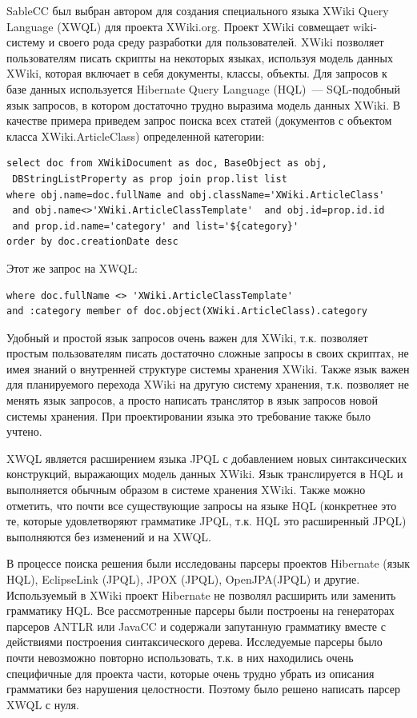 \documentclass[a4paper,12pt,titlepage]{extarticle}
\begin{document}
SableCC был выбран автором для создания специального языка XWiki Query Language
(XWQL) \cite{xwql} для проекта XWiki.org. Проект XWiki совмещает wiki-систему и
своего рода среду разработки для пользователей. XWiki позволяет пользователям
писать скрипты на некоторых языках, используя модель данных XWiki, которая
включает в себя документы, классы, объекты. Для запросов к базе данных
используется Hibernate Query Language (HQL)~--- SQL-подобный язык запросов, в
котором достаточно трудно выразима модель данных XWiki. В качестве примера
приведем запрос поиска всех статей (документов с объектом класса
XWiki.ArticleClass) определенной категории:
\begin{verbatim}
select doc from XWikiDocument as doc, BaseObject as obj, 
 DBStringListProperty as prop join prop.list list
where obj.name=doc.fullName and obj.className='XWiki.ArticleClass' 
 and obj.name<>'XWiki.ArticleClassTemplate'  and obj.id=prop.id.id
 and prop.id.name='category' and list='${category}'
order by doc.creationDate desc
\end{verbatim}
Этот же запрос на XWQL:
\begin{verbatim}
where doc.fullName <> 'XWiki.ArticleClassTemplate' 
and :category member of doc.object(XWiki.ArticleClass).category
\end{verbatim}
Удобный и простой язык запросов очень важен для XWiki, т.к. позволяет простым
пользователям писать достаточно сложные запросы в своих скриптах, не имея
знаний о внутренней структуре системы хранения XWiki. Также язык важен для
планируемого перехода XWiki на другую систему хранения, т.к. позволяет не менять
язык запросов, а просто написать транслятор в язык запросов новой системы
хранения. При проектировании языка это требование также было учтено.

XWQL является расширением языка JPQL \cite{jpql} с добавлением новых
синтаксических конструкций, выражающих модель данных XWiki. Язык транслируется
в HQL и выполняется обычным образом в системе хранения XWiki.  Также
можно отметить, что почти все существующие запросы на языке HQL (конкретнее это
те, которые удовлетворяют грамматике JPQL, т.к. HQL это расширенный JPQL)
выполняются без изменений и на XWQL.

В процессе поиска решения были исследованы парсеры проектов Hibernate (язык
HQL), EclipseLink (JPQL), JPOX (JPQL), OpenJPA(JPQL) и другие.
Используемый в XWiki проект Hibernate не позволял расширить или заменить
грамматику HQL.
Все рассмотренные парсеры были построены на генераторах парсеров ANTLR или
JavaCC и содержали запутанную грамматику вместе с действиями построения
синтаксического дерева.
Исследуемые парсеры было почти невозможно повторно использовать, т.к. в
них находились очень специфичные для проекта части, которые очень трудно убрать
из описания грамматики без нарушения целостности. Поэтому было решено написать
парсер XWQL с нуля.
\end{document}
